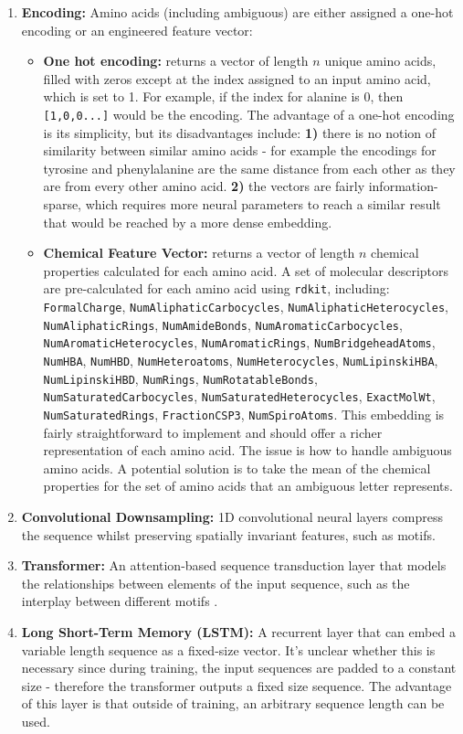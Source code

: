 \documentclass{article}
\begin{document}
\begin{enumerate}
	\item \textbf{Encoding:} Amino acids (including ambiguous) are either assigned a one-hot encoding or an engineered feature vector:
		\begin{itemize}
			\item \textbf{One hot encoding:} returns a vector of length $n$ unique amino acids, filled with zeros except at the index assigned to an input amino acid, which is set to 1. For example, if the index for alanine is 0, then \texttt{[1,0,0...]} would be the encoding. The advantage of a one-hot encoding is its simplicity, but its disadvantages include: \textbf{1)} there is no notion of similarity between similar amino acids - for example the encodings for tyrosine and phenylalanine are the same distance from each other as they are from every other amino acid. \textbf{2)} the vectors are fairly information-sparse, which requires more neural parameters to reach a similar result that would be reached by a more dense embedding.
			\item \textbf{Chemical Feature Vector:} returns a vector of length $n$ chemical properties calculated for each amino acid. A set of molecular descriptors are pre-calculated for each amino acid using \texttt{rdkit}, including: \texttt{FormalCharge}, \texttt{NumAliphaticCarbocycles}, \texttt{NumAliphaticHeterocycles}, \texttt{NumAliphaticRings}, \texttt{NumAmideBonds}, \texttt{NumAromaticCarbocycles}, \texttt{NumAromaticHeterocycles}, \texttt{NumAromaticRings}, \texttt{NumBridgeheadAtoms}, \texttt{NumHBA}, \texttt{NumHBD}, \texttt{NumHeteroatoms}, \texttt{NumHeterocycles}, \texttt{NumLipinskiHBA}, \texttt{NumLipinskiHBD}, \texttt{NumRings}, \texttt{NumRotatableBonds}, \texttt{NumSaturatedCarbocycles}, \texttt{NumSaturatedHeterocycles}, \texttt{ExactMolWt}, \texttt{NumSaturatedRings}, \texttt{FractionCSP3}, \texttt{NumSpiroAtoms}. This embedding is fairly straightforward to implement and should offer a richer representation of each amino acid. The issue is how to handle ambiguous amino acids. A potential solution is to take the mean of the chemical properties for the set of amino acids that an ambiguous letter represents.


		\end{itemize}
	\item \textbf{Convolutional Downsampling:} 1D convolutional neural layers compress the sequence whilst preserving spatially invariant features, such as motifs. 
	\item \textbf{Transformer:} An attention-based sequence transduction layer that models the relationships between elements of the input sequence, such as the interplay between different motifs \cite{vaswani2017attention}.
	\item \textbf{Long Short-Term Memory (LSTM):} A recurrent layer that can embed a variable length sequence as a fixed-size vector. It's unclear whether this is necessary since during training, the input sequences are padded to a constant size - therefore the transformer outputs a fixed size sequence. The advantage of this layer is that outside of training, an arbitrary sequence length can be used.
\end{enumerate}
\end{document}
